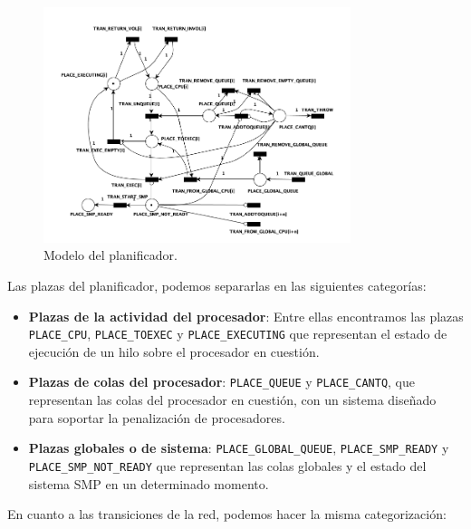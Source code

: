\begin{figure}[H]
    \centering
    \includegraphics[width=0.8\textwidth]{images/Resource_1CPU.png}
    \caption{Modelo del planificador.}
    \label{fig:schedulerModel}
\end{figure}

Las plazas del planificador, podemos separarlas en las siguientes categorías:

\begin{itemize}
    \item \textbf{Plazas de la actividad del procesador}: Entre ellas encontramos las plazas \verb|PLACE_CPU|, \verb|PLACE_TOEXEC| y \verb|PLACE_EXECUTING| que representan el estado de ejecución de un hilo sobre el procesador en cuestión.
    \item \textbf{Plazas de colas del procesador}: \verb|PLACE_QUEUE| y \verb|PLACE_CANTQ|, que representan las colas del procesador en cuestión, con un sistema diseñado para soportar la penalización de procesadores.
    \item \textbf{Plazas globales o de sistema}: \verb|PLACE_GLOBAL_QUEUE|, \verb|PLACE_SMP_READY| y \verb|PLACE_SMP_NOT_READY| que representan las colas globales y el estado del sistema SMP en un determinado momento.
\end{itemize}

En cuanto a las transiciones de la red, podemos hacer la misma categorización:


